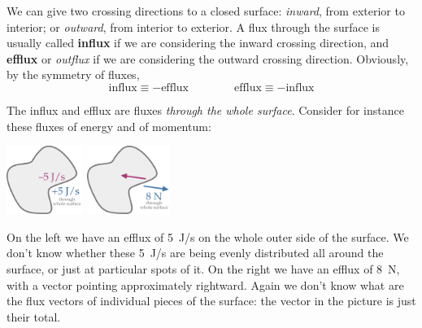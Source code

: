 \documentclass[a4paper,12pt,%
onecolumn,oneside,titlepage,%
british%
]{memoir}
\renewcommand*{\|}[1][]{\nonscript\:#1\vert\nonscript\:\mathopen{}}
\begin{document}

We can give two crossing directions to a closed surface: \emph{inward}, from exterior to interior; or \emph{outward}, from interior to exterior. A flux through the surface is usually called \textbf{influx} if we are considering the inward crossing direction, and \textbf{efflux} or \emph{outflux} if we are considering the outward crossing direction. Obviously, by the symmetry of fluxes,
\begin{equation*}
  \text{influx} \equiv -\text{efflux}
  \qquad\qquad
  \text{efflux} \equiv -\text{influx}
\end{equation*}



The influx and efflux are fluxes \emph{through the whole surface}. Consider for instance these fluxes of energy and of momentum:
\begin{center}
  \hspace*{\fill}
  \includegraphics[align=c,height=6em]{images/efflux_J.pdf}
  \hfill
  \includegraphics[align=c,height=6em]{images/efflux_N.pdf}
  \hspace*{\fill}
\end{center}
On the left we have an efflux of \qty{+5}{J/s} on the whole outer side of the surface. We don't know whether these \qty{5}{J/s} are being evenly distributed all around the surface, or just at particular spots of it. On the right we have an efflux of \qty{8}{N}, with a vector pointing approximately rightward. Again we don't know what are the flux vectors of individual pieces of the surface: the vector in the picture is just their total.
\end{document}
